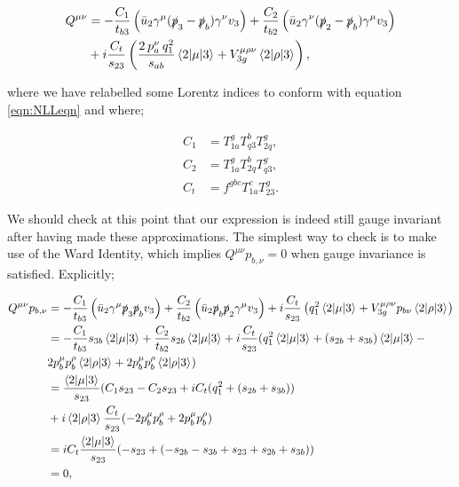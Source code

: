 \begin{equation}
\begin{split}
Q^{\mu \nu} &= -\frac{C_1}{t_{b3}} \left(\bar{u}_2 \gamma^\mu (\slashed{p}_3-\slashed{p}_b)\gamma^\nu v_3 \right) + \frac{C_2}{t_{b2}} \left( \bar{u}_2 \gamma^\nu (\slashed{p}_2-\slashed{p}_b) \gamma^\mu v_3 \right) \\
&+ i  \frac{C_t}{s_{23}} \left(\frac{2 \hspace{2pt} p_a^\nu \hspace{2pt} q_1^2}{s_{ab}}  \mathinner{\langle2\vert\mu\vert3\rangle}_{} + V^{\mu \rho \nu}_{3g}  \mathinner{\langle2\vert\rho\vert3\rangle}_{} \right),
\end{split}
\end{equation}

where we have relabelled some Lorentz indices to conform with equation \ref{eqn:NLLeqn} and where;

\begin{subequations}
\begin{align}
C_1 &= T^g_{1a} T^b_{q3}T^g_{2q}, \\
C_2 &= T^g_{1a} T^b_{2q}T^g_{q3}, \\
C_t &= f^{gbc}T^c_{1a}T^g_{23}.
\end{align}
\end{subequations}

We should check at this point that our expression is indeed still gauge invariant after having made these approximations. The simplest way to check is to make use of the Ward Identity, which implies $Q^{\mu \nu} p_{b, \nu} = 0$ when gauge invariance is satisfied. Explicitly; 

\begin{equation}
\begin{split}
Q^{\mu \nu}p_{b, \nu} &= -\frac{C_1}{t_{b3}} \left(\bar{u}_2 \gamma^\mu \slashed{p}_3 \slashed{p}_b v_3 \right) + \frac{C_2}{t_{b2}} \left( \bar{u}_2 \slashed{p}_b \slashed{p}_2 \gamma^\mu v_3 \right) + i  \frac{C_t}{s_{23}} \left(q_1^2  \mathinner{\langle2\vert\mu\vert3\rangle}_{} + V^{\mu \rho \nu}_{3g}p_{b \nu}  \mathinner{\langle2\vert\rho\vert3\rangle}_{} \right) \\
&= -\frac{C_1}{t_{b3}} s_{3b} \mathinner{\langle2\vert\mu\vert3\rangle}_{} + \frac{C_2}{t_{b2}} s_{2b} \mathinner{\langle2\vert\mu\vert3\rangle}_{} + i \frac{C_t}{s_{23}}(q_1^2 \mathinner{\langle2\vert\mu\vert3\rangle}_{} + (s_{2b} + s_{3b})\mathinner{\langle2\vert\mu\vert3\rangle}_{} - \\
&2p_b^\mu p_b^\rho\mathinner{\langle2\vert\rho\vert3\rangle}_{} + 2p_b^\mu p_b^\rho \mathinner{\langle2\vert\rho\vert3\rangle}_{}) \\
&= \frac{\mathinner{\langle2\vert\mu\vert3\rangle}_{}}{s_{23}}(C_1 s_{23} - C_2 s_{23} + i C_t(q_1^2 + (s_{2b} + s_{3b})) \\
&+ i\mathinner{\langle2\vert\rho\vert3\rangle}_{} \frac{C_t}{s_{23}}(-2p_b^\mu p_b^\rho + 2p_b^\mu p_b^\rho) \\
&= i C_t \frac{\mathinner{\langle2\vert\mu\vert3\rangle}_{}}{s_{23}}(-s_{23} + (-s_{2b} - s_{3b} + s_{23} + s_{2b} + s_{3b})) \\
&= 0,
\end{split}
\end{equation}

